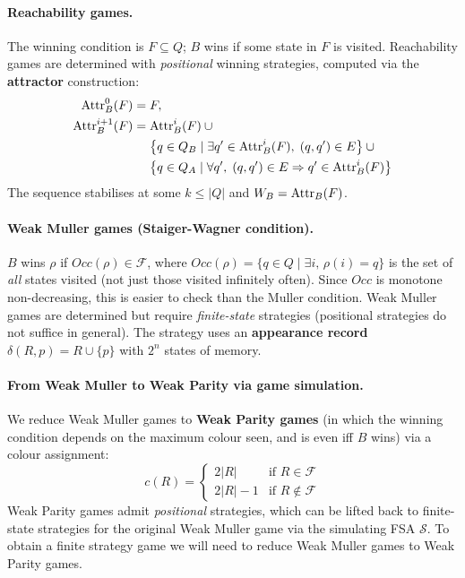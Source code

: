 \documentclass[oneside]{academica}
\begin{document}
\paragraph{Reachability games.}
The winning condition is $F \subseteq Q$; $B$ wins if some state in $F$ is visited. Reachability games are determined with \emph{positional} winning strategies, computed via the \textbf{attractor} construction:
\begin{align*}
  \text{Attr}^0_B(F) = {} & F, \\
  \text{Attr}^{i+1}_B(F) = {} & \text{Attr}^i_B(F) \cup {}\\
                     & \bigl\{q \in Q_B \mid \exists q' \in \text{Attr}^i_B(F),\; (q,q') \in E\bigr\} \cup {}\\
                     & \bigl\{q \in Q_A \mid \forall q',\; (q,q') \in E \Rightarrow q' \in \text{Attr}^i_B(F)\bigr\}
\end{align*}
The sequence stabilises at some $k \le |Q|$ and $W_B = \text{Attr}_B(F)$.

\paragraph{Weak Muller games (Staiger-Wagner condition).}
$B$ wins $\rho$ if $\mathit{Occ}(\rho) \in \mathcal{F}$, where $\mathit{Occ}(\rho) = \{q \in Q \mid \exists i,\, \rho(i) = q\}$ is the set of \emph{all} states visited (not just those visited infinitely often). Since $\mathit{Occ}$ is monotone non-decreasing, this is easier to check than the Muller condition. Weak Muller games are determined but require \emph{finite-state} strategies (positional strategies do not suffice in general). The strategy uses an \textbf{appearance record} $\delta(R, p) = R \cup \{p\}$ with $2^n$ states of memory.

\paragraph{From Weak Muller to Weak Parity via game simulation.}
We reduce Weak Muller games to \textbf{Weak Parity games} (in which the winning condition depends on the maximum colour seen, and is even iff $B$ wins) via a colour assignment:
\begin{equation*}
  c(R) = \begin{cases} 2|R| & \text{if } R \in \mathcal{F} \\ 2|R|-1 & \text{if } R \notin \mathcal{F} \end{cases}
\end{equation*}
Weak Parity games admit \emph{positional} strategies, which can be lifted back to finite-state strategies for the original Weak Muller game via the simulating FSA $\mathcal{S}$.
To obtain a finite strategy game we will need to reduce Weak Muller games to Weak Parity games.
\end{document}

